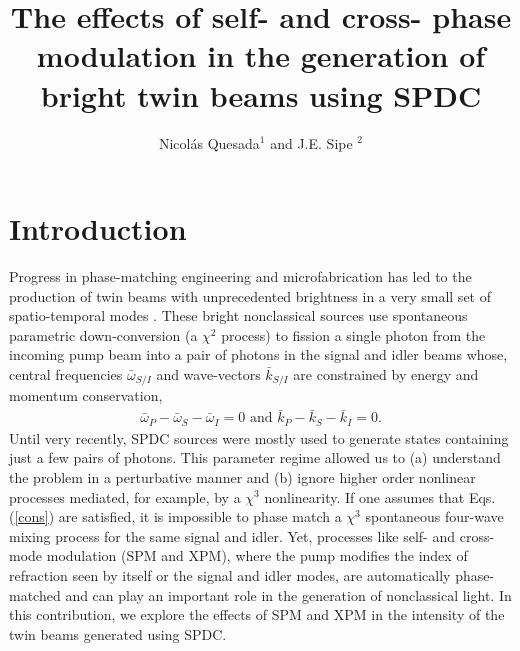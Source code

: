 \documentclass[letterpaper,10pt]{article}
\begin{document}
\title{The effects of self- and cross- phase modulation in the generation of bright twin beams using SPDC}

\author{Nicol\'as Quesada$^1$ and J.E. Sipe $^2$}
\address{$^1$ Department of Physics \& Astronomy, Macquarie University, NSW 2109, Australia \\ $^2$ Department of Physics, University of Toronto, Toronto, ON, M5S1A7, Canada}

\begin{abstract}

\end{abstract}


\section{Introduction}
Progress in phase-matching engineering and microfabrication has led to the production of twin beams with unprecedented brightness in a very small set of spatio-temporal modes \cite{harder,lemieux}. These bright nonclassical sources use spontaneous parametric down-conversion (a $\chi^2$ process) to fission a single photon from the incoming pump beam into a pair of photons in the signal and idler beams whose, central frequencies $\bar \omega_{S/I}$ and wave-vectors $\bar k_{S/I}$ are constrained by energy and momentum conservation,
\begin{align}\label{cons}
\bar \omega_P-\bar \omega_S-\bar \omega_I=0 \text{ and } \bar k_P-\bar k_S-\bar k_I=0.
\end{align}
Until very recently, SPDC sources were mostly used to generate states containing just a few pairs of photons. This parameter regime allowed us to (a) understand the problem in a perturbative manner and (b) ignore higher order nonlinear processes mediated, for example, by a $\chi^3$ nonlinearity. If one assumes that Eqs. (\ref{cons}) are satisfied, it is impossible to phase match a $\chi^3$ spontaneous four-wave mixing process for the same signal and idler. Yet, processes like self- and cross- mode modulation (SPM and XPM), where the pump modifies the index of refraction seen by itself or the signal and idler modes, are automatically phase-matched and can play an important role in the generation of nonclassical light. In this contribution, we explore the effects of SPM and XPM in the intensity of the twin beams generated using SPDC.
\end{document}
